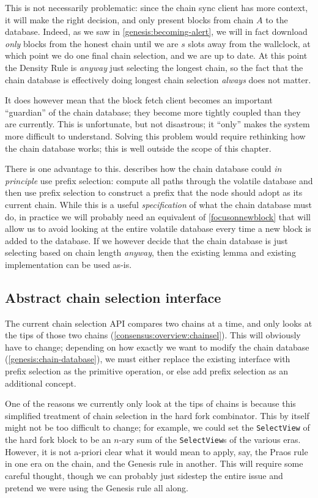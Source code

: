 This is not necessarily problematic: since the chain sync client has more
context, it will make the right decision, and only present blocks from chain $A$
to the database. Indeed, as we saw in \cref{genesis:becoming-alert}, we will
in fact download \emph{only} blocks from the honest chain until we are $s$
slots away from the wallclock, at which point we do one final chain selection,
and we are up to date. At this point the Density Rule is \emph{anyway} just
selecting the longest chain, so the fact that the chain database is effectively
doing longest chain selection \emph{always} does not matter.

It does however mean that the block fetch client becomes an important
``guardian'' of the chain database; they become more tightly coupled than they
are currently. This is unfortunate, but not disastrous; it ``only'' makes the
system more difficult to understand. Solving this problem would require
rethinking how the chain database works; this is well outside the scope of this
chapter.

There is one advantage to this.   describes how
the chain database could \emph{in principle} use prefix selection: compute all
paths through the volatile database and then use prefix selection to construct a
prefix that the node should adopt as its current chain. While this is a useful
\emph{specification} of what the chain database must do, in practice we will
probably need an equivalent of \cref{focusonnewblock} that will allow us to
avoid looking at the entire volatile database every time a new block is added to
the database. If we however decide that the chain database is just selecting
based on chain length \emph{anyway}, then the existing lemma and existing
implementation can be used as-is.

\subsection{Abstract chain selection interface}

The current chain selection API compares two chains at a time, and only looks at
the tips of those two chains (\cref{consensus:overview:chainsel}). This will
obviously have to change; depending on how exactly we want to modify the chain
database (\cref{genesis:chain-database}), we must either replace the existing
interface with prefix selection as the primitive operation, or else add prefix
selection as an additional concept.

One of the reasons we currently only look at the tips of chains is because this
simplified treatment of chain selection in the hard fork combinator. This by
itself might not be too difficult to change; for example, we could set the
\lstinline!SelectView! of the hard fork block to be an $n$-ary sum of the
\lstinline!SelectView!s of the various eras. However, it is not a-priori clear
what it would mean to apply, say, the Praos rule in one era on the chain,
and the Genesis rule in another. This will require some careful thought,
though we can probably just sidestep the entire issue and pretend we were
using the Genesis rule all along.

